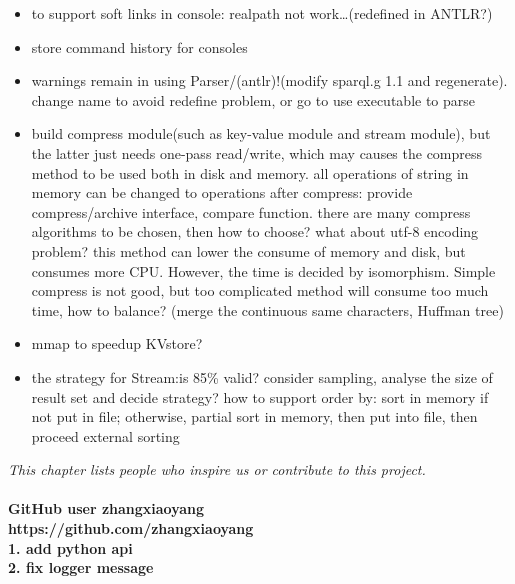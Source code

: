 \documentclass[titlepage, a4paper, 12pt]{article}
\begin{document}
\begin{itemize}
\item
  to support soft links in console: realpath not work\ldots{}(redefined
  in ANTLR?)
\item
  store command history for consoles
\item
  warnings remain in using Parser/(antlr)!(modify sparql.g 1.1 and
  regenerate). change name to avoid redefine problem, or go to use
  executable to parse
\item
  build compress module(such as key-value module and stream module), but
  the latter just needs one-pass read/write, which may causes the
  compress method to be used both in disk and memory. all operations of
  string in memory can be changed to operations after compress: provide
  compress/archive interface, compare function. there are many compress
  algorithms to be chosen, then how to choose? what about utf-8 encoding
  problem? this method can lower the consume of memory and disk, but
  consumes more CPU. However, the time is decided by isomorphism. Simple
  compress is not good, but too complicated method will consume too much
  time, how to balance? (merge the continuous same characters, Huffman
  tree)
\item
  mmap to speedup KVstore?
\item
  the strategy for Stream:is 85\% valid? consider sampling, analyse the
  size of result set and decide strategy? how to support order by: sort
  in memory if not put in file; otherwise, partial sort in memory, then
  put into file, then proceed external sorting
\end{itemize}

\clearpage


\textit{This chapter lists people who inspire us or contribute to this project.}

\paragraph{GitHub user zhangxiaoyang \\
	https://github.com/zhangxiaoyang \\
	1. add python api \\
	2. fix logger message}
\end{document}
